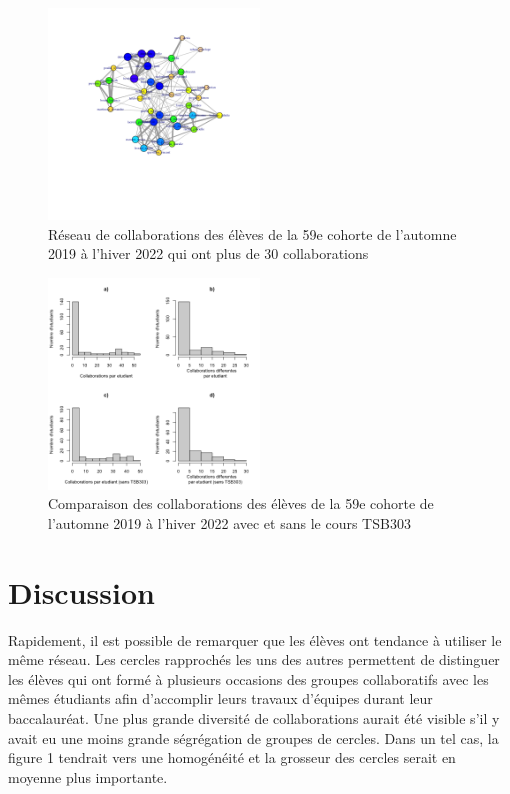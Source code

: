 \documentclass[9pt,twocolumn,twoside,]{pnas-new}
\begin{document}
\begin{figure}
\centering
\includegraphics[width=0.5\textwidth,height=0.4\textheight]{"../results/figure3.png"}
\caption{Réseau de collaborations des élèves de la 59e cohorte de
l'automne 2019 à l'hiver 2022 qui ont plus de 30 collaborations
\label{fig:plot3}}
\end{figure}

\begin{figure}
\centering
\includegraphics[width=0.5\textwidth,height=0.4\textheight]{"../results/figure4.png"}
\caption{Comparaison des collaborations des élèves de la 59e cohorte de
l'automne 2019 à l'hiver 2022 avec et sans le cours TSB303
\label{fig:plot4}}
\end{figure}

\hypertarget{discussion}{%
\section{Discussion}\label{discussion}}

Rapidement, il est possible de remarquer que les élèves ont tendance à
utiliser le même réseau. Les cercles rapprochés les uns des autres
permettent de distinguer les élèves qui ont formé à plusieurs occasions
des groupes collaboratifs avec les mêmes étudiants afin d'accomplir
leurs travaux d'équipes durant leur baccalauréat. Une plus grande
diversité de collaborations aurait été visible s'il y avait eu une moins
grande ségrégation de groupes de cercles. Dans un tel cas, la figure 1
tendrait vers une homogénéité et la grosseur des cercles serait en
moyenne plus importante.
\end{document}
